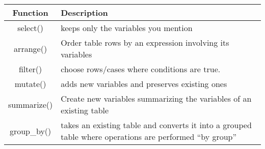 \documentclass[
]{book}
\begin{document}
\begin{longtable}[]{@{}cl@{}}
\toprule
\begin{minipage}[b]{0.50\columnwidth}\centering
Function\strut
\end{minipage} & \begin{minipage}[b]{0.44\columnwidth}\raggedright
Description\strut
\end{minipage}\tabularnewline
\midrule
\endhead
\begin{minipage}[t]{0.50\columnwidth}\centering
select()\strut
\end{minipage} & \begin{minipage}[t]{0.44\columnwidth}\raggedright
keeps only the variables you mention\strut
\end{minipage}\tabularnewline
\begin{minipage}[t]{0.50\columnwidth}\centering
arrange()\strut
\end{minipage} & \begin{minipage}[t]{0.44\columnwidth}\raggedright
Order table rows by an expression involving its variables\strut
\end{minipage}\tabularnewline
\begin{minipage}[t]{0.50\columnwidth}\centering
filter()\strut
\end{minipage} & \begin{minipage}[t]{0.44\columnwidth}\raggedright
choose rows/cases where conditions are true.\strut
\end{minipage}\tabularnewline
\begin{minipage}[t]{0.50\columnwidth}\centering
mutate()\strut
\end{minipage} & \begin{minipage}[t]{0.44\columnwidth}\raggedright
adds new variables and preserves existing ones\strut
\end{minipage}\tabularnewline
\begin{minipage}[t]{0.50\columnwidth}\centering
summarize()\strut
\end{minipage} & \begin{minipage}[t]{0.44\columnwidth}\raggedright
Create new variables summarizing the variables of an existing table\strut
\end{minipage}\tabularnewline
\begin{minipage}[t]{0.50\columnwidth}\centering
group\_by()\strut
\end{minipage} & \begin{minipage}[t]{0.44\columnwidth}\raggedright
takes an existing table and converts it into a grouped table where operations are performed ``by group''\strut
\end{minipage}\tabularnewline
\bottomrule
\end{longtable}
\end{document}
